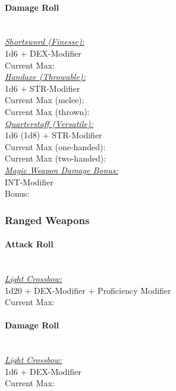 \documentclass[letterpaper,openany,oneside,twocolumn]{book}
\begin{document}
\paragraph*{Damage Roll}\hfill\\
\underline{\textit{Shortsword (Finesse):}}\\
1d6 + DEX-Modifier\\
\indent Current Max: 
\\
\underline{\textit{Handaxe (Throwable):}}\\
1d6 + STR-Modifier\\
\indent Current Max (melee): \\
\indent Current Max (thrown): 
\\
\underline{\textit{Quarterstaff (Versatile):}}\\
1d6 (1d8) + STR-Modifier\\
\indent Current Max (one-handed): \\
\indent Current Max (two-handed): 
\\
\underline{\textit{Magic Weapon Damage Bonus:}}\\
INT-Modifier\\
\indent Bonus: \calculateModifier{\IntelligenceScoreValue}
\subsubsection*{Ranged Weapons}
\paragraph*{Attack Roll}\hfill\\
\underline{\textit{Light Crossbow:}}\\
1d20 + DEX-Modifier + Proficiency Modifier\\
\indent Current Max: 
\paragraph*{Damage Roll}\hfill\\
\underline{\textit{Light Crossbow:}}\\
1d6 + DEX-Modifier\\
\indent Current Max: 
\end{document}
